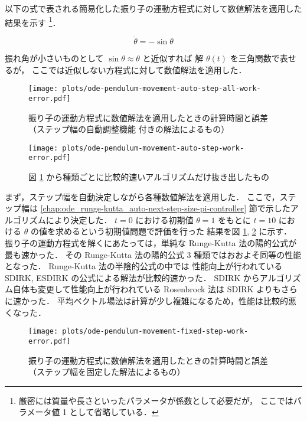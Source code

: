以下の式で表される簡易化した振り子の運動方程式に対して数値解法を適用した結果を示す
\footnote{厳密には質量や長さといったパラメータが係数として必要だが，%
    ここではパラメータ値 1 として省略している．}．

\begin{equation}
    \ddot{\theta} = -\sin{\theta}
\end{equation}

振れ角が小さいものとして $\sin{\theta} \approx \theta$ と近似すれば
解 $\theta(t)$ を三角関数で表せるが，
ここでは近似しない方程式に対して数値解法を適用した．

\begin{figure}[tp]
    \centering
    \texttt{[image: plots/ode-pendulum-movement-auto-step-all-work-error.pdf]}
    \caption{振り子の運動方程式に数値解法を適用したときの計算時間と誤差%
        （ステップ幅の自動調整機能 \cite{Gustafsson1991} 付きの解法によるもの）}
    \label{fig:ode_experiments_pendulum-movement_auto-step-all-work-error}
\end{figure}

\begin{figure}[tp]
    \centering
    \texttt{[image: plots/ode-pendulum-movement-auto-step-work-error.pdf]}
    \caption{図 \ref{fig:ode_experiments_pendulum-movement_auto-step-all-work-error} %
        から種類ごとに比較的速いアルゴリズムだけ抜き出したもの}
    \label{fig:ode_experiments_pendulum-movement_auto-step-work-error}
\end{figure}

まず，ステップ幅を自動決定しながら各種数値解法を適用した．
ここで，ステップ幅は \ref{chap:ode_runge-kutta_auto-next-step-size-pi-controller} 節で示したアルゴリズムにより決定した．
$t=0$ における初期値 $\theta = 1$ をもとに $t=10$ における $\theta$ の値を求めるという初期値問題で評価を行った
結果を図
\ref{fig:ode_experiments_pendulum-movement_auto-step-all-work-error},
\ref{fig:ode_experiments_pendulum-movement_auto-step-work-error}
に示す．
振り子の運動方程式を解くにあたっては，単純な Runge-Kutta 法の陽的公式が最も速かった．
その Runge-Kutta 法の陽的公式 3 種類ではおおよそ同等の性能となった．
Runge-Kutta 法の半陰的公式の中では
性能向上が行われている SDIRK, ESDIRK の公式による解法が比較的速かった．
SDIRK からアルゴリズム自体も変更して性能向上が行われている Rosenbrock 法は SDIRK よりもさらに速かった．
平均ベクトル場法は計算が少し複雑になるため，性能は比較的悪くなった．

\begin{figure}[tp]
    \centering
    \texttt{[image: plots/ode-pendulum-movement-fixed-step-work-error.pdf]}
    \caption{振り子の運動方程式に数値解法を適用したときの計算時間と誤差%
        （ステップ幅を固定した解法によるもの）}
    \label{fig:ode_experiments_pendulum-movement_fixed-step-work-error}
\end{figure}

